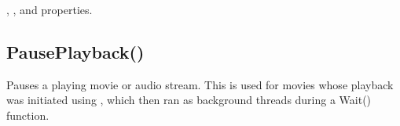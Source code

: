\documentclass[letterpaper,10pt,english]{sphinxmanual}
\begin{document}
\begin{sphinxVerbatim}[commandchars=\\\{\}]
\end{sphinxVerbatim}

\sphinxAtStartPar
{}

\begin{sphinxVerbatim}[commandchars=\\\{\}]
\end{sphinxVerbatim}

\sphinxAtStartPar
{}

\sphinxAtStartPar
{}, ,  and  properties.

\ignorespaces 

\subsection{PausePlayback()}
\label{\detokenize{reference/peblobjects:pauseplayback}}\label{\detokenize{reference/peblobjects:index-32}}
\sphinxAtStartPar
{}

\sphinxAtStartPar
{}

\sphinxAtStartPar
Pauses a playing movie or audio stream.  This is used for  movies whose playback was initiated using , which then ran as background threads during a Wait() function.

\sphinxAtStartPar
{}

\begin{sphinxVerbatim}[commandchars=\\\{\}]
\end{sphinxVerbatim}

\sphinxAtStartPar
{}
\end{document}
